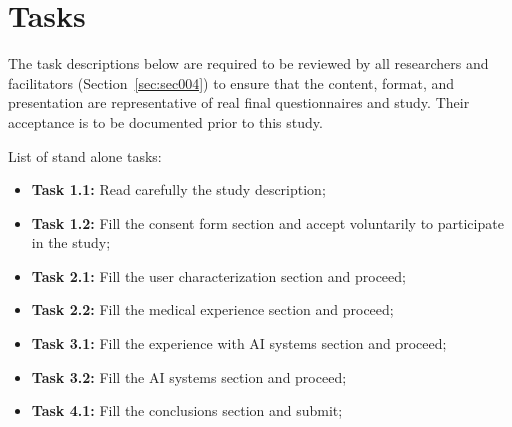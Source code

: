 
\section{Tasks}
\label{sec:sec007}

The task descriptions below are required to be reviewed by all researchers and facilitators (Section~\ref{sec:sec004}) to ensure that the content, format, and presentation are representative of real final questionnaires and study.
Their acceptance is to be documented prior to this study.

\hfil


\noindent
List of stand alone tasks:


\hfill

\begin{itemize}
\item[] \textbf{Task 1.1:} Read carefully the study description;
\item[] \textbf{Task 1.2:} Fill the consent form section and accept voluntarily to participate in the study;
\item[] \textbf{Task 2.1:} Fill the user characterization section and proceed;
\item[] \textbf{Task 2.2:} Fill the medical experience section and proceed;
\item[] \textbf{Task 3.1:} Fill the experience with AI systems section and proceed;
\item[] \textbf{Task 3.2:} Fill the AI systems section and proceed;
\item[] \textbf{Task 4.1:} Fill the conclusions section and submit;
\end{itemize}

